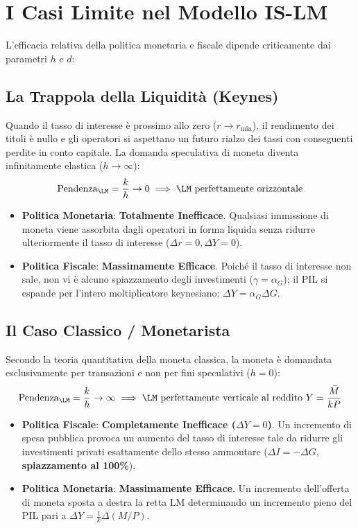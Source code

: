 \section{I Casi Limite nel Modello IS-LM}

L'efficacia relativa della politica monetaria e fiscale dipende criticamente dai parametri $h$ e $d$:

\subsection{La Trappola della Liquidità (Keynes)}
Quando il tasso di interesse è prossimo allo zero ($r \to r_{\min}$), il rendimento dei titoli è nullo e gli operatori si aspettano un futuro rialzo dei tassi con conseguenti perdite in conto capitale. La domanda speculativa di moneta diventa infinitamente elastica ($h \to \infty$):
\begin{equation}
    \text{Pendenza}_{\LM} = \frac{k}{h} \to 0 \implies \LM \text{ perfettamente orizzontale}
\end{equation}
\begin{itemize}
    \item \textbf{Politica Monetaria}: \textbf{Totalmente Inefficace}. Qualsiasi immissione di moneta viene assorbita dagli operatori in forma liquida senza ridurre ulteriormente il tasso di interesse ($\Delta r = 0, \Delta Y = 0$).
    \item \textbf{Politica Fiscale}: \textbf{Massimamente Efficace}. Poiché il tasso di interesse non sale, non vi è alcuno spiazzamento degli investimenti ($\gamma = \alpha_G$); il PIL si espande per l'intero moltiplicatore keynesiano: $\Delta Y = \alpha_G \Delta G$.
\end{itemize}

\subsection{Il Caso Classico / Monetarista}
Secondo la teoria quantitativa della moneta classica, la moneta è domandata esclusivamente per transazioni e non per fini speculativi ($h = 0$):
\begin{equation}
    \text{Pendenza}_{\LM} = \frac{k}{h} \to \infty \implies \LM \text{ perfettamente verticale al reddito } Y = \frac{\bar{M}}{k P}
\end{equation}
\begin{itemize}
    \item \textbf{Politica Fiscale}: \textbf{Completamente Inefficace ($\Delta Y = 0$)}. Un incremento di spesa pubblica provoca un aumento del tasso di interesse tale da ridurre gli investimenti privati esattamente dello stesso ammontare ($\Delta I = -\Delta G$, \textbf{spiazzamento al 100\%}).
    \item \textbf{Politica Monetaria}: \textbf{Massimamente Efficace}. Un incremento dell'offerta di moneta sposta a destra la retta LM determinando un incremento pieno del PIL pari a $\Delta Y = \frac{1}{k}\Delta (M/P)$.
\end{itemize}

